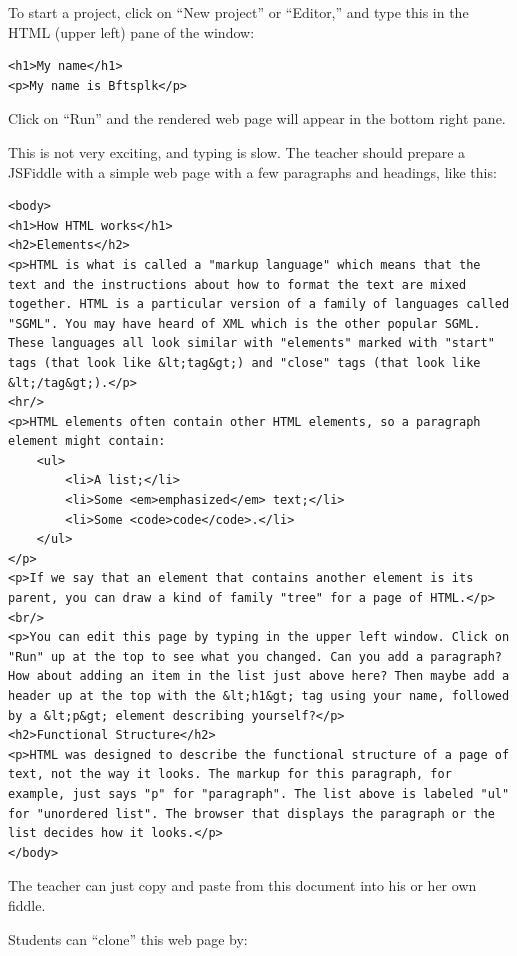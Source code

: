 \documentclass[11pt]{article}
\begin{document}
To start a project, click on ``New project'' or ``Editor,'' and type
this in the HTML (upper left) pane of the window:

\begin{verbatim}
<h1>My name</h1>
<p>My name is Bftsplk</p>
\end{verbatim}

Click on ``Run'' and the rendered web page will appear in the bottom
right pane.


This is not very exciting, and typing is slow.  The teacher should
prepare a JSFiddle with a simple web page with a few paragraphs and
headings, like this:

\begin{verbatim}
<body>
<h1>How HTML works</h1>
<h2>Elements</h2>
<p>HTML is what is called a "markup language" which means that the
text and the instructions about how to format the text are mixed
together. HTML is a particular version of a family of languages called
"SGML". You may have heard of XML which is the other popular SGML.
These languages all look similar with "elements" marked with "start"
tags (that look like &lt;tag&gt;) and "close" tags (that look like
&lt;/tag&gt;).</p>
<hr/>
<p>HTML elements often contain other HTML elements, so a paragraph
element might contain:
    <ul>
        <li>A list;</li>
        <li>Some <em>emphasized</em> text;</li>
        <li>Some <code>code</code>.</li>
    </ul>
</p>
<p>If we say that an element that contains another element is its
parent, you can draw a kind of family "tree" for a page of HTML.</p>
<br/>
<p>You can edit this page by typing in the upper left window. Click on
"Run" up at the top to see what you changed. Can you add a paragraph?
How about adding an item in the list just above here? Then maybe add a
header up at the top with the &lt;h1&gt; tag using your name, followed
by a &lt;p&gt; element describing yourself?</p>
<h2>Functional Structure</h2>
<p>HTML was designed to describe the functional structure of a page of
text, not the way it looks. The markup for this paragraph, for
example, just says "p" for "paragraph". The list above is labeled "ul"
for "unordered list". The browser that displays the paragraph or the
list decides how it looks.</p>
</body>
\end{verbatim}

The teacher can just copy and paste from this document into his or her
own fiddle.

Students can ``clone'' this web page by:
\end{document}
